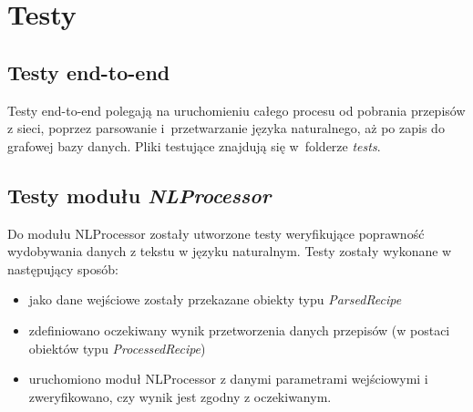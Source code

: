 \documentclass[11pt,a4paper]{article}
\begin{document}

\newpage
\section{Testy}
\subsection{Testy end-to-end}
Testy end-to-end polegają na uruchomieniu całego procesu od pobrania przepisów z sieci, poprzez parsowanie i~przetwarzanie języka naturalnego, aż po zapis do grafowej bazy danych. Pliki testujące znajdują się w~folderze \textit{tests}.

\subsection{Testy modułu \textit{NLProcessor}}
Do modułu NLProcessor zostały utworzone testy weryfikujące poprawność wydobywania danych z tekstu w języku naturalnym. Testy zostały wykonane w następujący sposób:
\begin{itemize}
\item jako dane wejściowe zostały przekazane obiekty typu \textit{ParsedRecipe} 
\item zdefiniowano oczekiwany wynik przetworzenia danych przepisów (w postaci obiektów typu \textit{ProcessedRecipe})
\item uruchomiono moduł NLProcessor z danymi parametrami wejściowymi i zweryfikowano, czy wynik jest zgodny z oczekiwanym.  
\end{itemize}
\end{document}
